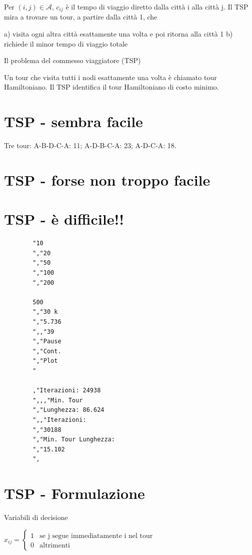 \documentclass[a4paper, 11pt]{article}
\begin{document}
        Per $(i,j)\in\mathcal{A}$, $c_{ij}$ è il tempo di viaggio diretto dalla città i alla città j.
        Il TSP mira a trovare un tour, a partire dalla città 1, che

        a) visita ogni altra città esattamente una volta e poi ritorna alla città 1
        b) richiede il minor tempo di viaggio totale

        Il problema del commesso viaggiatore (TSP)

        Un tour che visita tutti i nodi esattamente una volta è chiamato tour Hamiltoniano.
        Il TSP identifica il tour Hamiltoniano di costo minimo.

        \section*{TSP - sembra facile}


        Tre tour: A-B-D-C-A: 11; A-D-B-C-A: 23; A-D-C-A: 18.

        \section*{TSP - forse non troppo facile}


        \section*{TSP - è difficile!!}


        \begin{verbatim}
        "10
        ","20
        ","50
        ","100
        ","200

        500
        ","30 k
        ","5.736
        ",,"39
        ","Pause
        ","Cont.
        ","Plot
        "

        ,"Iterazioni: 24938
        ",,,"Min. Tour
        ","Lunghezza: 86.624
        ",,"Iterazioni:
        ","30188
        ","Min. Tour Lunghezza:
        ","15.102
        ",
        \end{verbatim}

        \section*{TSP - Formulazione}

        Variabili di decisione

        $x_{ij}=\begin{cases}1 & \text{se j segue immediatamente i nel tour} \\ 0 & \text{altrimenti}\end{cases}$
\end{document}
